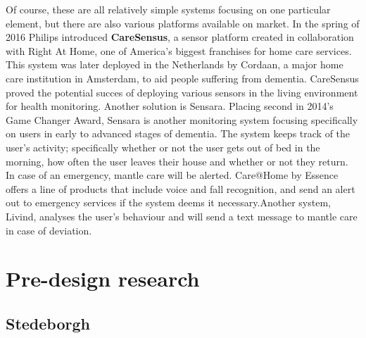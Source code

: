 \documentclass{below-ext}
\begin{document}
Of course, these are all relatively simple systems focusing on one particular element, but there are also various platforms available on market. In the spring of 2016 Philips introduced \textbf{CareSensus}, a sensor platform created in collaboration with Right At Home, one of America's biggest franchises for  home care services. This system was later deployed in the Netherlands by Cordaan, a major home care institution in Amsterdam, to aid people suffering from dementia. CareSensus proved the potential succes of deploying various sensors in the living environment for health monitoring. Another solution is Sensara. Placing second in 2014's Game Changer Award, Sensara is another monitoring system focusing specifically on users in early to advanced stages of dementia. The system keeps track of the user's activity; specifically whether or not the user gets out of bed in the morning, how often the user leaves their house and whether or not they return. In case of an emergency, mantle care will be alerted. Care@Home by Essence offers a line of products that include voice and fall recognition, and send an alert out to emergency services if the system deems it necessary.Another system, Livind, analyses the user's behaviour and will send a text message to mantle care in case of deviation. 

\section{Pre-design research}

\subsection{Stedeborgh}
\end{document}
